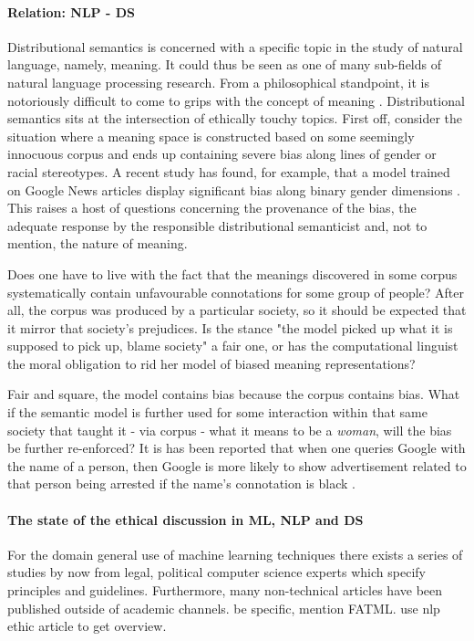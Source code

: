 \documentclass{article}
\begin{document}
\paragraph{Relation: NLP - DS}
Distributional semantics is concerned with a specific topic in the study of natural language, namely, meaning. It could thus be seen as one of many sub-fields of natural language processing research. 
From a philosophical standpoint, it is notoriously difficult to come to grips with the concept of meaning .
Distributional semantics sits at the intersection of ethically touchy topics. 
First off, consider the situation where a meaning space is constructed based on some seemingly innocuous corpus and ends up containing severe bias along lines of gender or racial stereotypes. A recent study has found, for example, that a model trained on Google News articles display significant bias along binary gender dimensions \cite{bolukbasi2016man}. This raises a host of questions concerning the provenance of the bias, the adequate response by the responsible distributional semanticist and, not to mention, the nature of meaning.

Does one have to live with the fact that the meanings discovered in some corpus systematically contain unfavourable connotations for some group of people? After all, the corpus was produced by a particular society, so it should be expected that it mirror that society's prejudices. Is the stance "the model picked up what it is supposed to pick up, blame society" a fair one, or has the computational linguist the moral obligation to rid her model of biased meaning representations?

Fair and square, the model contains bias because the corpus contains bias. What if the semantic model is further used for some interaction within that same society that taught it - via corpus - what it means to be a \emph{woman}, will the bias be further re-enforced? It is has been reported that when one queries Google with the name of a person, then Google is more likely to show advertisement related to that person being arrested if the name's connotation is black \cite{sweeney2013discrimination}.

\paragraph{The state of the ethical discussion in ML, NLP and DS}
For the domain general use of machine learning techniques there exists a series of studies by now from legal, political computer science experts which specify principles and guidelines. Furthermore, many non-technical articles have been published outside of academic channels. 
be specific, mention FATML. use nlp ethic article to get overview.\\
\end{document}
